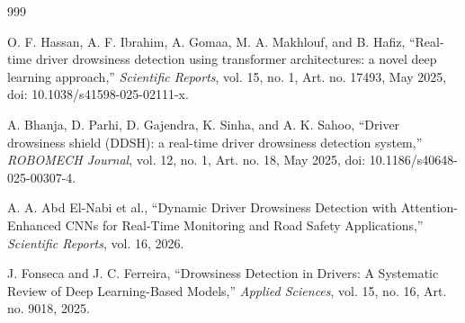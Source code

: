 \documentclass[a4paper,12pt]{report}
\begin{document}
\vspace{1.5cm}

\renewcommand{\bibname}{\uppercase{REFERENCES}}
\begin{thebibliography}{999}

O. F. Hassan, A. F. Ibrahim, A. Gomaa, M. A. Makhlouf, and B. Hafiz, ``Real-time driver drowsiness detection using transformer architectures: a novel deep learning approach,'' \textit{Scientific Reports}, vol. 15, no. 1, Art. no. 17493, May 2025, doi: 10.1038/s41598-025-02111-x.

A. Bhanja, D. Parhi, D. Gajendra, K. Sinha, and A. K. Sahoo, ``Driver drowsiness shield (DDSH): a real-time driver drowsiness detection system,'' \textit{ROBOMECH Journal}, vol. 12, no. 1, Art. no. 18, May 2025, doi: 10.1186/s40648-025-00307-4.

A. A. Abd El-Nabi et al., ``Dynamic Driver Drowsiness Detection with Attention-Enhanced CNNs for Real-Time Monitoring and Road Safety Applications,'' \textit{Scientific Reports}, vol. 16, 2026.

J. Fonseca and J. C. Ferreira, ``Drowsiness Detection in Drivers: A Systematic Review of Deep Learning-Based Models,'' \textit{Applied Sciences}, vol. 15, no. 16, Art. no. 9018, 2025.

\end{thebibliography}
\end{document}
